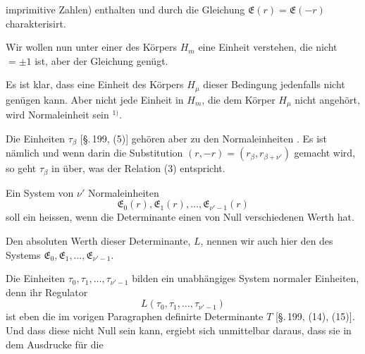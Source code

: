 imprimitive Zahlen) enthalten und durch die Gleichung $\mathfrak{E}(r)
= \mathfrak{E}(-r)$ charakterisirt.

Wir wollen nun unter einer  des Körpers $H_m$
eine Einheit verstehen, die nicht $= \pm 1$ ist, aber der Gleichung
genügt.

Es ist klar, dass eine Einheit des Körpers $H_\mu$ dieser Bedingung
 jedenfalls nicht genügen kann. Aber nicht jede Einheit
in $H_m$, die dem Körper $H_\mu$ nicht angehört, wird Normaleinheit
sein $^{1)}$.

Die Einheiten $\tau_\beta$ [\S.\,199, (5)] gehören aber zu den Normaleinheiten
. Es ist nämlich
und wenn darin die Substitution $(r,-r) = (r_\beta, r_{\beta+\nu'})$ gemacht
wird, so geht $\tau_\beta$ in
über, was der Relation (3) entspricht.

Ein System von $\nu'$ Normaleinheiten
\[
\mathfrak{E}_0(r), \mathfrak{E}_1(r), \ldots, \mathfrak{E}_{\nu'-1}(r)
\]
soll ein  heissen, wenn die Determinante
einen von Null verschiedenen Werth hat.

Den absoluten Werth dieser Determinante, $L$, nennen wir
auch hier den  des Systems $\mathfrak{E}_0, \mathfrak{E}_1, \ldots, \mathfrak{E}_{\nu'-1}$.

Die Einheiten $\tau_0, \tau_1, \ldots, \tau_{\nu'-1}$ bilden ein unabhängiges System
normaler Einheiten, denn ihr Regulator
\[
L(\tau_0, \tau_1, \ldots, \tau_{\nu'-1})
\]
ist eben die im vorigen Paragraphen definirte Determinante $T$
[\S.\,199, (14), (15)]. Und dass diese nicht Null sein kann, ergiebt
sich unmittelbar daraus, dass sie in dem Ausdrucke für die

\par{}
